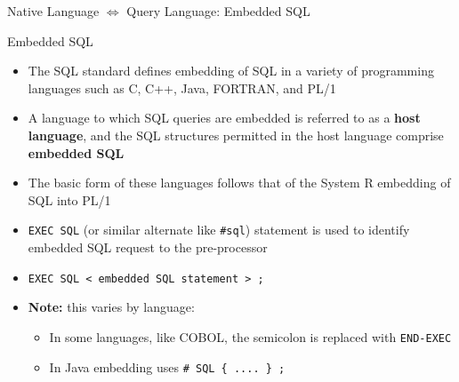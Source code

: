 \documentclass[aspectratio=169, xcolor=dvipsnames]{beamer}
\begin{document}
\begin{frame}{Native Language $\Leftrightarrow$ Query Language: Embedded SQL}
    \begin{center}
    \end{center}
\end{frame}

\begin{frame}{Embedded SQL}
    \begin{itemize}
        \item The SQL standard defines embedding of SQL in a variety of programming languages such as C, C++, Java, FORTRAN, and PL/1
        \item A language to which SQL queries are embedded is referred to as a \textbf{host language}, and the SQL structures permitted in the host language comprise \textbf{embedded SQL}
        \item The basic form of these languages follows that of the System R embedding of SQL into PL/1
        \item \texttt{EXEC SQL} (or similar alternate like \texttt{\#sql}) statement is used to identify embedded SQL request to the pre-processor
        \item \texttt{EXEC SQL < embedded SQL statement > ;}
        \item \textbf{Note:} this varies by language:
        \begin{itemize}
            \item In some languages, like COBOL, the semicolon is replaced with \texttt{END-EXEC}
            \item In Java embedding uses \texttt{\# SQL \{ .... \} ;}
        \end{itemize}
    \end{itemize}
\end{frame}
\end{document}

